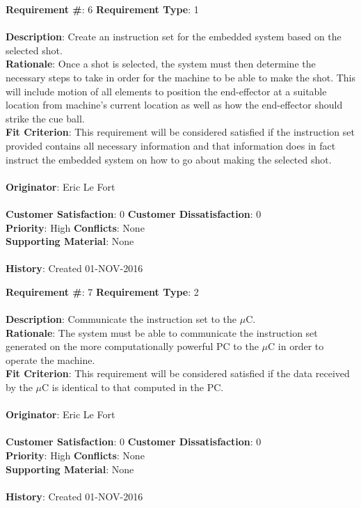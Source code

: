 \documentclass[titlepage]{article}
\begin{document}
\begin{framed}
	\noindent\textbf{Requirement \#}: 6 \hfill \textbf{Requirement Type}: 1 \hfill\\\\
	\noindent\textbf{Description}: Create an instruction set for the embedded system based on the selected shot.\\
	\textbf{Rationale}: Once a shot is selected, the system must then determine the necessary steps to take in order for the machine to be able to make the shot. This will include motion of all elements to position the end-effector at a suitable location from machine's current location as well as how the end-effector should strike the cue ball.\\
	\textbf{Fit Criterion}: This requirement will be considered satisfied if the instruction set provided contains all necessary information and that information does in fact instruct the embedded system on how to go about making the selected shot.\\\\
	\textbf{Originator}: Eric Le Fort\\\\
	\noindent\textbf{Customer Satisfaction}: 0 \hfill 	\textbf{Customer Dissatisfaction}: 0 \hfill\\
	\textbf{Priority}: High \hfill \textbf{Conflicts}: None \hfill\\
	\textbf{Supporting Material}: None\\\\
	\noindent\textbf{History}: Created 01-NOV-2016
\end{framed}

\begin{framed}
	\noindent\textbf{Requirement \#}: 7 \hfill \textbf{Requirement Type}: 2 \hfill\\\\
	\noindent\textbf{Description}: Communicate the instruction set to the $\mu$C.\\
	\textbf{Rationale}: The system must be able to communicate the instruction set generated on the more computationally powerful PC to the $\mu$C in order to operate the machine.\\
	\textbf{Fit Criterion}: This requirement will be considered satisfied if the data received by the $\mu$C is identical to that computed in the PC.\\\\
	\textbf{Originator}: Eric Le Fort\\\\
	\noindent\textbf{Customer Satisfaction}: 0 \hfill 	\textbf{Customer Dissatisfaction}: 0 \hfill\\
	\textbf{Priority}: High \hfill \textbf{Conflicts}: None \hfill\\
	\textbf{Supporting Material}: None\\\\
	\noindent\textbf{History}: Created 01-NOV-2016
\end{framed}
\end{document}
